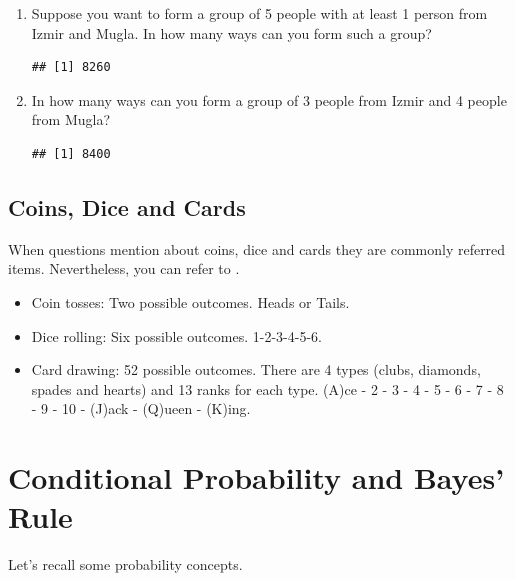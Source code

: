 \documentclass[]{book}
\providecommand{\tightlist}{%
  \setlength{\itemsep}{0pt}\setlength{\parskip}{0pt}}
\theoremstyle{definition}
\theoremstyle{definition}
\theoremstyle{definition}
\theoremstyle{remark}
\begin{document}
\begin{itemize}
  \begin{enumerate}
  \def\labelenumi{\alph{enumi})}
  \item
    Suppose you want to form a group of 5 people with at least 1 person
    from Izmir and Mugla. In how many ways can you form such a group?

\begin{verbatim}
## [1] 8260
\end{verbatim}
  \item
    In how many ways can you form a group of 3 people from Izmir and 4
    people from Mugla?

\begin{verbatim}
## [1] 8400
\end{verbatim}
  \end{enumerate}
\end{itemize}

\hypertarget{coins-dice-and-cards}{%
\section{Coins, Dice and Cards}\label{coins-dice-and-cards}}

When questions mention about coins, dice and cards they are commonly
referred items. Nevertheless, you can refer to .

\begin{itemize}
\tightlist
\item
  Coin tosses: Two possible outcomes. Heads or Tails.
\item
  Dice rolling: Six possible outcomes. 1-2-3-4-5-6.
\item
  Card drawing: 52 possible outcomes. There are 4 types (clubs,
  diamonds, spades and hearts) and 13 ranks for each type. (A)ce - 2 - 3
  - 4 - 5 - 6 - 7 - 8 - 9 - 10 - (J)ack - (Q)ueen - (K)ing.
\end{itemize}

\hypertarget{cond}{%
\chapter{Conditional Probability and Bayes' Rule}\label{cond}}

Let's recall some probability concepts.
\end{document}
